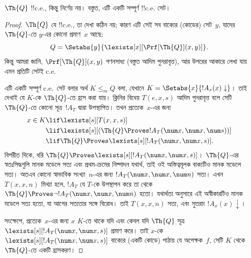 \documentclass[../../../include/open-logic-section]{subfiles}
\begin{document}



\begin{thm}
$\Th{Q}$ !!{c.e.}, কিন্তু নির্ণেয় নয়। বস্তুত, এটি একটি সম্পূর্ণ
!!{c.e.} সেট।
\end{thm}

\begin{proof}
$\Th{Q}$ যে !!{c.e.}, তা দেখা কঠিন নয়; কারণ এটি সেই সব বাক্যের
(কোডের) সেট~$y$, যাদের $\Th{Q}$-তে $y$-এর কোনো প্রমাণ~$x$ আছে:
\[
Q = \Setabs{y}{\lexists[x][\Prf[\Th{Q}](x,y)]}.
\]
কিন্তু আমরা জানি, $\Prf[\Th{Q}](x,y)$ গণনসাধ্য (বস্তুত আদিম
পুনরাবৃত্ত), আর উপরের আকারে লেখা যায় এমন প্রতিটি সেটই c.e.

এটি একটি সম্পূর্ণ c.e.\ সেট বলার অর্থ $K \leq_m Q$ বলা, যেখানে
$K = \Setabs{x}{!A_x(x) \downarrow}$। তাই দেখাই যে $K$-কে $\Th{Q}$-তে
হ্রাস করা যায়। ক্লিনির বিধেয় $T(e,x,s)$ আদিম পুনরাবৃত্ত বলে সেটি
$\Th{Q}$-তে কোনো সূত্র~$!A_T$ দ্বারা উপস্থাপিত। তখন প্রত্যেক~$x$-এর জন্য
\begin{align*}
x \in K & \lif \lexists[s][T(x,x,s)] \\
& \lif \lexists[s][(\Th{Q} \Proves !A_T(\num x,\num x, \num s))]
  \\
& \lif \Th{Q} \Proves \lexists[s][!A_T(\num x, \num x, s)].
\end{align*}
বিপরীত দিকে, ধরি $\Th{Q} \Proves
\lexists[s][!A_T(\num x, \num x, s)]$। $\Th{Q}$-এর স্বতঃসিদ্ধগুলি
মানক মডেলে সত্য এবং প্রথম-ক্রমের নিষ্পাদন যথার্থ, তাই ওই অস্তিত্বমূলক
বাক্যটিও মানক মডেলে সত্য। অতএব কোনো স্বাভাবিক সংখ্যা~$n$-এর জন্য
$!A_T(\num x, \num x, \num n)$ সত্য। এখন $T(x,x,n)$ মিথ্যা হলে,
$!A_T$ যে $T$-কে উপস্থাপন করে তা থেকে
$\Th{Q} \Proves \lnot !A_T(\num x, \num x, \num n)$ হতো। যথার্থতা
অনুসারে এই অস্বীকারটিও মানক মডেলে সত্য হতো, যা আগের সত্যতার সঙ্গে
বিরোধ। তাই $T(x,x,n)$ সত্য, এবং সুতরাং $!A_x(x) \downarrow$।

সংক্ষেপে, প্রত্যেক~$x$-এর জন্য $x$ $K$-তে থাকে যদি এবং কেবল যদি
$\Th{Q}$ সূত্র $\lexists[s][!A_T(\num x,\num x,s)]$ প্রমাণ করে। তাই
$x$-কে $\lexists[s][!A_T(\num x,\num x,s)]$ বাক্যের (একটি কোডে) পাঠায়
যে অপেক্ষক~$f$, সেটি $K$ থেকে $\Th{Q}$-তে একটি হ্রাসকরণ।
\end{proof}
\end{document}
